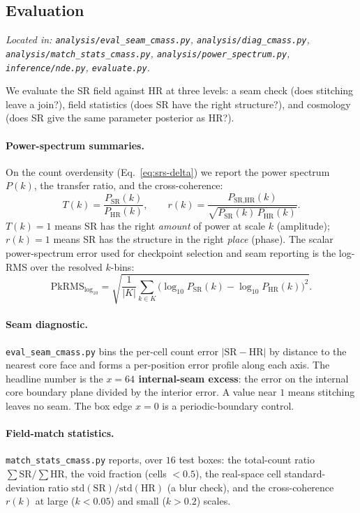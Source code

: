 \subsection{Evaluation}
\label{sec:srs-eval}
\textit{Located in: \texttt{analysis/eval\_seam\_cmass.py},
\texttt{analysis/diag\_cmass.py}, \texttt{analysis/match\_stats\_cmass.py},
\texttt{analysis/power\_spectrum.py}, \texttt{inference/nde.py},
\texttt{evaluate.py}.}

We evaluate the SR field against HR at three levels: a seam check (does stitching
leave a join?), field statistics (does SR have the right structure?), and
cosmology (does SR give the same parameter posterior as HR?).

\paragraph{Power-spectrum summaries.} On the count overdensity (Eq.~\ref{eq:srs-delta})
we report the power spectrum $P(k)$, the transfer ratio, and the cross-coherence:
\begin{equation}
  T(k) = \frac{P_\text{SR}(k)}{P_\text{HR}(k)},
  \qquad
  r(k) = \frac{P_{\text{SR},\text{HR}}(k)}{\sqrt{P_\text{SR}(k)\,P_\text{HR}(k)}} .
  \label{eq:srs-Tr}
\end{equation}
$T(k)=1$ means SR has the right \emph{amount} of power at scale $k$ (amplitude);
$r(k)=1$ means SR has the structure in the right \emph{place} (phase). The
scalar power-spectrum error used for checkpoint selection and seam reporting is
the log-RMS over the resolved $k$-bins:
\begin{equation}
  \mathrm{PkRMS}_{\log_{10}} = \sqrt{\frac{1}{|K|}\sum_{k\in K}
    \big(\log_{10} P_\text{SR}(k) - \log_{10} P_\text{HR}(k)\big)^2 } .
  \label{eq:srs-pkrms}
\end{equation}

\paragraph{Seam diagnostic.} \texttt{eval\_seam\_cmass.py} bins the per-cell
count error $|{\mathrm{SR}-\mathrm{HR}}|$ by distance to the nearest core face
and forms a per-position error profile along each axis. The headline number is
the \textbf{$x{=}64$ internal-seam excess}: the error on the internal core
boundary plane divided by the interior error. A value near $1$ means stitching
leaves no seam. The box edge $x{=}0$ is a periodic-boundary control.

\paragraph{Field-match statistics.} \texttt{match\_stats\_cmass.py} reports, over
$16$ test boxes: the total-count ratio $\sum\mathrm{SR}/\sum\mathrm{HR}$, the
void fraction (cells $<0.5$), the real-space cell standard-deviation ratio
$\mathrm{std}(\mathrm{SR})/\mathrm{std}(\mathrm{HR})$ (a blur check), and the
cross-coherence $r(k)$ at large ($k<0.05$) and small ($k>0.2$) scales.

